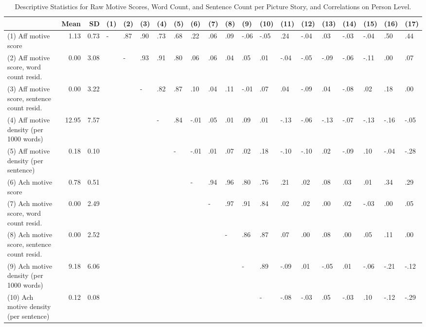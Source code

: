 \documentclass[man,a4paper,mask]{apa6}\usepackage[]{graphicx}\usepackage[]{color}
\begin{document}
\begin{table}
	\begin{threeparttable}
		\caption{Descriptive Statistics for Raw Motive Scores, Word Count, and Sentence Count per Picture Story, and Correlations on Person Level.}
		\label{tab:descCor}
		\footnotesize
		\begin{tabularx}{\textwidth}{Xrrlllllllllllllllll}
		\toprule
 & Mean & SD & (1) & (2) & (3) & (4) & (5) & (6) & (7) & (8) & (9) & (10) & (11) & (12) & (13) & (14) & (15) & (16) & (17) \\ 
  \hline
(1) Aff motive score & 1.13 & 0.73 & - & .87 & .90 & .73 & .68 & .22 & .06 & .09 & -.06 & -.05 & .24 & -.04 & .03 & -.03 & -.04 & .50 & .44 \\ 
  (2) Aff motive score, word count resid. & 0.00 & 3.08 &  & - & .93 & .91 & .80 & .06 & .06 & .04 & .05 & .01 & -.04 & -.05 & -.09 & -.06 & -.11 & .00 & .07 \\ 
  (3) Aff motive score, sentence count resid. & 0.00 & 3.22 &  &  & - & .82 & .87 & .10 & .04 & .11 & -.01 & .07 & .04 & -.09 & .04 & -.08 & .02 & .18 & .00 \\ 
  (4) Aff motive density (per 1000 words) & 12.95 & 7.57 &  &  &  & - & .84 & -.01 & .05 & .01 & .09 & .01 & -.13 & -.06 & -.13 & -.07 & -.13 & -.16 & -.05 \\ 
  (5) Aff motive density (per sentence) & 0.18 & 0.10 &  &  &  &  & - & -.01 & .01 & .07 & .02 & .18 & -.10 & -.10 & .02 & -.09 & .10 & -.04 & -.28 \\ 
  (6) Ach motive score & 0.78 & 0.51 &  &  &  &  &  & - & .94 & .96 & .80 & .76 & .21 & .02 & .08 & .03 & .01 & .34 & .29 \\ 
  (7) Ach motive score, word count resid. & 0.00 & 2.49 &  &  &  &  &  &  & - & .97 & .91 & .84 & .02 & .02 & .00 & .02 & -.03 & .00 & .05 \\ 
  (8) Ach motive score, sentence count resid. & 0.00 & 2.52 &  &  &  &  &  &  &  & - & .86 & .87 & .07 & .00 & .08 & .00 & .05 & .11 & .00 \\ 
  (9) Ach motive density (per 1000 words) & 9.18 & 6.06 &  &  &  &  &  &  &  &  & - & .89 & -.09 & .01 & -.05 & .01 & -.06 & -.21 & -.12 \\ 
  (10) Ach motive density (per sentence) & 0.12 & 0.08 &  &  &  &  &  &  &  &  &  & - & -.08 & -.03 & .05 & -.03 & .10 & -.12 & -.29 \\ 

\end{tabularx}
\end{threeparttable}
\end{table}
\end{document}
